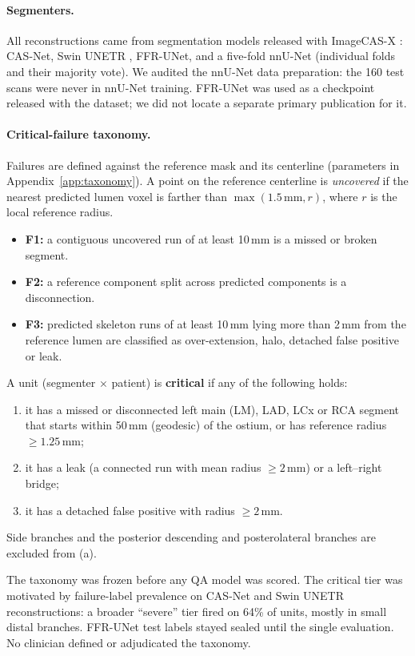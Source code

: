\documentclass[11pt]{article}
\begin{document}
\paragraph{Segmenters.} All reconstructions came from segmentation models released with ImageCAS-X \citep{bransby2026imagecasx}: CAS-Net, Swin UNETR \citep{hatamizadeh2022swinunetr}, FFR-UNet, and a five-fold nnU-Net \citep{isensee2021nnunet} (individual folds and their majority vote). We audited the nnU-Net data preparation: the 160 test scans were never in nnU-Net training. FFR-UNet was used as a checkpoint released with the dataset; we did not locate a separate primary publication for it.

\paragraph{Critical-failure taxonomy.} Failures are defined against the reference mask and its centerline (parameters in Appendix~\ref{app:taxonomy}). A point on the reference centerline is \emph{uncovered} if the nearest predicted lumen voxel is farther than $\max(1.5\,\mathrm{mm}, r)$, where $r$ is the local reference radius.
\begin{itemize}
\item \textbf{F1:} a contiguous uncovered run of at least 10\,mm is a missed or broken segment.
\item \textbf{F2:} a reference component split across predicted components is a disconnection.
\item \textbf{F3:} predicted skeleton runs of at least 10\,mm lying more than 2\,mm from the reference lumen are classified as over-extension, halo, detached false positive or leak.
\end{itemize}
A unit (segmenter $\times$ patient) is \textbf{critical} if any of the following holds:
\begin{enumerate}
\item[(a)] it has a missed or disconnected left main (LM), LAD, LCx or RCA segment that starts within 50\,mm (geodesic) of the ostium, or has reference radius $\geq 1.25$\,mm;
\item[(b)] it has a leak (a connected run with mean radius $\geq 2$\,mm) or a left--right bridge;
\item[(c)] it has a detached false positive with radius $\geq 2$\,mm.
\end{enumerate}
Side branches and the posterior descending and posterolateral branches are excluded from (a).

The taxonomy was frozen before any QA model was scored. The critical tier was motivated by failure-label prevalence on CAS-Net and Swin UNETR reconstructions: a broader ``severe'' tier fired on 64\% of units, mostly in small distal branches. FFR-UNet test labels stayed sealed until the single evaluation. No clinician defined or adjudicated the taxonomy.
\end{document}
